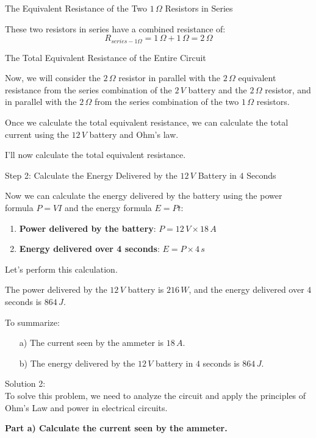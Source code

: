 \documentclass[a4paper,11pt]{article}
\begin{document}
The Equivalent Resistance of the Two \(1\,\Omega\) Resistors in Series

These two resistors in series have a combined resistance of:
\[ R_{series-1\Omega} = 1\,\Omega + 1\,\Omega = 2\,\Omega \]

The Total Equivalent Resistance of the Entire Circuit

Now, we will consider the \(2\,\Omega\) resistor in parallel with the \(2\,\Omega\) equivalent resistance from the series combination of the \(2\,V\) battery and the \(2\,\Omega\) resistor, and in parallel with the \(2\,\Omega\) from the series combination of the two \(1\,\Omega\) resistors.

Once we calculate the total equivalent resistance, we can calculate the total current using the \(12\,V\) battery and Ohm's law.

I'll now calculate the total equivalent resistance.

Step 2: Calculate the Energy Delivered by the \(12\,V\) Battery in \(4\) Seconds

Now we can calculate the energy delivered by the battery using the power formula \(P = VI\) and the energy formula \(E = Pt\):

\begin{enumerate}
  \item \textbf{Power delivered by the battery}: \(P = 12\,V \times 18\,A\)
  \item \textbf{Energy delivered over 4 seconds}: \(E = P \times 4\,s\)
\end{enumerate}

Let's perform this calculation.

The power delivered by the \(12\,V\) battery is \(216\,W\), and the energy delivered over \(4\) seconds is \(864\,J\).

To summarize:
\begin{itemize}
    \item[a)] The current seen by the ammeter is \(18\,A\).
    \item[b)] The energy delivered by the \(12\,V\) battery in \(4\) seconds is \(864\,J\).
\end{itemize} 

\bigskip

\noindent Solution 2: \\

To solve this problem, we need to analyze the circuit and apply the principles of Ohm's Law and power in electrical circuits.

\textbf{Part a) Calculate the current seen by the ammeter.}
\end{document}
